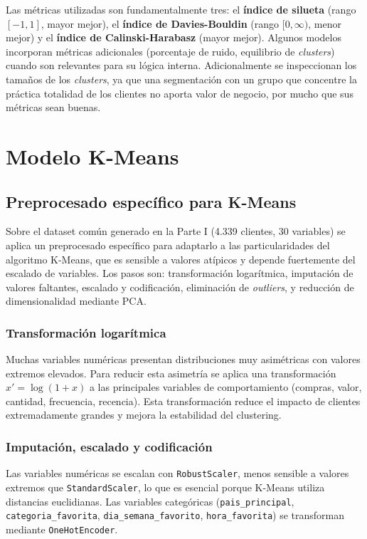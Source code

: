 \documentclass[11pt,a4paper]{article}
\begin{document}
Las métricas utilizadas son fundamentalmente tres: el \textbf{índice de silueta} (rango $[-1, 1]$, mayor mejor), el \textbf{índice de Davies-Bouldin} (rango $[0, \infty)$, menor mejor) y el \textbf{índice de Calinski-Harabasz} (mayor mejor). Algunos modelos incorporan métricas adicionales (porcentaje de ruido, equilibrio de \textit{clusters}) cuando son relevantes para su lógica interna. Adicionalmente se inspeccionan los tamaños de los \textit{clusters}, ya que una segmentación con un grupo que concentre la práctica totalidad de los clientes no aporta valor de negocio, por mucho que sus métricas sean buenas.

\section{Modelo K-Means}
\label{sec:kmeans}

\subsection{Preprocesado específico para K-Means}

Sobre el dataset común generado en la Parte I (4.339 clientes, 30 variables) se aplica un preprocesado específico para adaptarlo a las particularidades del algoritmo K-Means, que es sensible a valores atípicos y depende fuertemente del escalado de variables. Los pasos son: transformación logarítmica, imputación de valores faltantes, escalado y codificación, eliminación de \textit{outliers}, y reducción de dimensionalidad mediante PCA.

\subsubsection{Transformación logarítmica}

Muchas variables numéricas presentan distribuciones muy asimétricas con valores extremos elevados. Para reducir esta asimetría se aplica una transformación $x' = \log(1+x)$ a las principales variables de comportamiento (compras, valor, cantidad, frecuencia, recencia). Esta transformación reduce el impacto de clientes extremadamente grandes y mejora la estabilidad del clustering.

\subsubsection{Imputación, escalado y codificación}

Las variables numéricas se escalan con \texttt{RobustScaler}, menos sensible a valores extremos que \texttt{StandardScaler}, lo que es esencial porque K-Means utiliza distancias euclidianas. Las variables categóricas (\texttt{pais\_principal}, \texttt{categoria\_favorita}, \texttt{dia\_semana\_favorito}, \texttt{hora\_favorita}) se transforman mediante \texttt{OneHotEncoder}.
\end{document}
